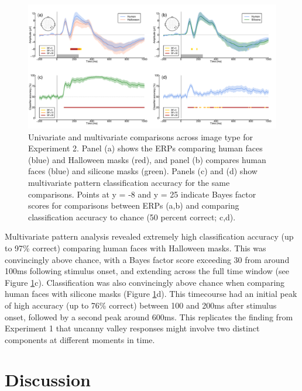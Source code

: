 \documentclass[
]{article}
\begin{document}
\begin{figure}

{\centering \includegraphics{Figures/MasksMVPA} 

}

\caption{Univariate and multivariate comparisons across image type for Experiment 2. Panel (a) shows the ERPs comparing human faces (blue) and Halloween masks (red), and panel (b) compares human faces (blue) and silicone masks (green). Panels (c) and (d) show multivariate pattern classification accuracy for the same comparisons. Points at y = -8 and y = 25 indicate Bayes factor scores for comparisons between ERPs (a,b) and comparing classification accuracy to chance (50 percent correct; c,d).}\label{fig:MasksMVPA}
\end{figure}

Multivariate pattern analysis revealed extremely high classification accuracy (up to 97\% correct) comparing human faces with Halloween masks. This was convincingly above chance, with a Bayes factor score exceeding 30 from around 100ms following stimulus onset, and extending across the full time window (see Figure \ref{fig:MasksMVPA}c). Classification was also convincingly above chance when comparing human faces with silicone masks (Figure \ref{fig:MasksMVPA}d). This timecourse had an initial peak of high accuracy (up to 76\% correct) between 100 and 200ms after stimulus onset, followed by a second peak around 600ms. This replicates the finding from Experiment 1 that uncanny valley responses might involve two distinct components at different moments in time.

\hypertarget{discussion}{%
\section{Discussion}\label{discussion}}
\end{document}

